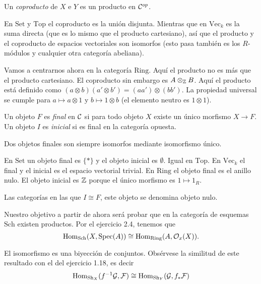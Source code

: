 \documentclass[GA.tex]{subfiles}
\begin{document}
\begin{defi}
Un \emph{coproducto} de $X$ e $Y$ es un producto en $\mathcal{C}^{op}$. 
\end{defi}
\begin{defi}
En $\mathrm{Set}$ y $\mathrm{Top}$ el coproducto es la unión disjunta. Mientras que en $\mathrm{Vec}_k$ es la suma directa (que es lo mismo que el producto cartesiano), así que el producto y el coproducto de espacios vectoriales son isomorfos (esto pasa también es los $R$-módulos y cualquier otra categoría abeliana). 
\end{defi}

Vamos a centrarnos ahora en la categoría $\mathrm{Ring}$. Aquí el producto no es más que el producto cartesiano. El coproducto sin embargo es $A\otimes_{\mathbb{Z}} B$. Aquí el producto está definido como $(a\otimes b)(a'\otimes b')=(aa')\otimes (bb')$. La propiedad universal se cumple para $a\mapsto a\otimes 1$ y $b\mapsto 1\otimes b$ (el elemento neutro es $1\otimes 1$). 

\begin{defi}
Un objeto $F$ es \emph{final} en $\mathcal{C}$ si para todo objeto $X$ existe un único morfismo $X\to F$. Un objeto $I$ es \emph{inicial} si es final en la categoría opuesta.
\end{defi}
Dos objetos finales son siempre isomorfos mediante isomorfismo único.

\begin{ej}
En $\mathrm{Set}$ un objeto final es $\{*\}$ y el objeto inicial es $\emptyset$. Igual en $\mathrm{Top}$. En $\mathrm{Vec}_k$ el final y el inicial es el espacio vectorial trivial. En $\mathrm{Ring}$ el objeto final es el anillo nulo. El objeto inicial es $\mathbb{Z}$ porque el único morfismo es $1\mapsto 1_R$. 
\end{ej}

Las categorías en las que $I\cong F$, este objeto se denomina objeto nulo. 

Nuestro objetivo a partir de ahora será probar que en la categoría de esquemas $\mathrm{Sch}$ existen productos. Por el ejercicio 2.4, tenemos que
\[
\operatorname{Hom}_{\mathrm{Sch}}(X,\operatorname{Spec}(A))\cong\operatorname{Hom}_{\mathrm{Ring}}(A,{\mathcal O}_x(X)).
\]

El isomorfismo es una biyección de conjuntos. Obsérvese la similitud de este resultado con el del ejercicio 1.18, es decir
\[
\operatorname{Hom}_{\mathrm{Sh}_X}(f^{-1}\mathcal{G},\mathcal{F})\cong \operatorname{Hom}_{\mathrm{Sh}_Y}(\mathcal{G}, f_*\mathcal{F})
\] 
\end{document}
